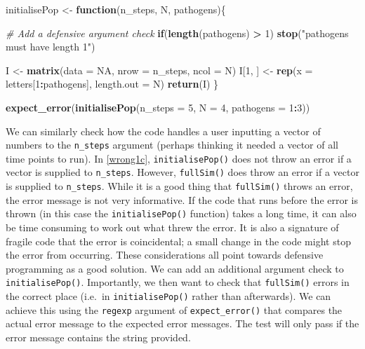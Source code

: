 \documentclass[
]{article}
\newenvironment{Shaded}{\begin{snugshade}}{\end{snugshade}}
\newcommand{\CommentTok}[1]{\textcolor[rgb]{0.56,0.35,0.01}{\textit{#1}}}
\newcommand{\ControlFlowTok}[1]{\textcolor[rgb]{0.13,0.29,0.53}{\textbf{#1}}}
\newcommand{\DataTypeTok}[1]{\textcolor[rgb]{0.13,0.29,0.53}{#1}}
\newcommand{\DecValTok}[1]{\textcolor[rgb]{0.00,0.00,0.81}{#1}}
\newcommand{\KeywordTok}[1]{\textcolor[rgb]{0.13,0.29,0.53}{\textbf{#1}}}
\newcommand{\NormalTok}[1]{#1}
\newcommand{\OperatorTok}[1]{\textcolor[rgb]{0.81,0.36,0.00}{\textbf{#1}}}
\newcommand{\OtherTok}[1]{\textcolor[rgb]{0.56,0.35,0.01}{#1}}
\newcommand{\StringTok}[1]{\textcolor[rgb]{0.31,0.60,0.02}{#1}}
\begin{document}
\begin{Shaded}
\begin{Highlighting}[]
\NormalTok{initialisePop <-}\StringTok{ }\ControlFlowTok{function}\NormalTok{(n_steps, N, pathogens)\{}
  
  \CommentTok{# Add a defensive argument check}
  \ControlFlowTok{if}\NormalTok{(}\KeywordTok{length}\NormalTok{(pathogens) }\OperatorTok{>}\StringTok{ }\DecValTok{1}\NormalTok{) }\KeywordTok{stop}\NormalTok{(}\StringTok{"pathogens must have length 1"}\NormalTok{)}
  
\NormalTok{  I <-}\StringTok{ }\KeywordTok{matrix}\NormalTok{(}\DataTypeTok{data =} \OtherTok{NA}\NormalTok{, }\DataTypeTok{nrow =}\NormalTok{ n_steps, }\DataTypeTok{ncol =}\NormalTok{ N)}
\NormalTok{  I[}\DecValTok{1}\NormalTok{, ] <-}\StringTok{ }\KeywordTok{rep}\NormalTok{(}\DataTypeTok{x =}\NormalTok{ letters[}\DecValTok{1}\OperatorTok{:}\NormalTok{pathogens], }\DataTypeTok{length.out =}\NormalTok{ N)}
  \KeywordTok{return}\NormalTok{(I)}
\NormalTok{\}}

\KeywordTok{expect_error}\NormalTok{(}\KeywordTok{initialisePop}\NormalTok{(}\DataTypeTok{n_steps =} \DecValTok{5}\NormalTok{, }\DataTypeTok{N =} \DecValTok{4}\NormalTok{, }\DataTypeTok{pathogens =} \DecValTok{1}\OperatorTok{:}\DecValTok{3}\NormalTok{))}
\end{Highlighting}
\end{Shaded}

We can similarly check how the code handles a user inputting a vector of numbers to the \texttt{n\_steps} argument (perhaps thinking it needed a vector of all time points to run).
In \ref{wrong1c}, \texttt{initialisePop()} does not throw an error if a vector is supplied to \texttt{n\_steps}.
However, \texttt{fullSim()} does throw an error if a vector is supplied to \texttt{n\_steps}.
While it is a good thing that \texttt{fullSim()} throws an error, the error message is not very informative.
If the code that runs before the error is thrown (in this case the \texttt{initialisePop()} function) takes a long time, it can also be time consuming to work out what threw the error.
It is also a signature of fragile code that the error is coincidental; a small change in the code might stop the error from occurring.
These considerations all point towards defensive programming as a good solution.
We can add an additional argument check to \texttt{initialisePop()}.
Importantly, we then want to check that \texttt{fullSim()} errors in the correct place (i.e.~in \texttt{initialisePop()} rather than afterwards).
We can achieve this using the \texttt{regexp} argument of \texttt{expect\_error()} that compares the actual error message to the expected error messages.
The test will only pass if the error message contains the string provided.
\newline
{}\label{wrong2}
\end{document}
